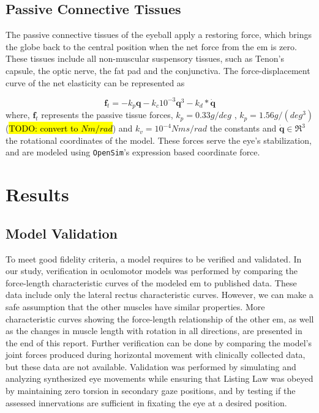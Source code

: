\documentclass[11pt,a4paper,draft=false]{report}
\renewcommand*{\vec}[1]{\bm{#1}}
\newcommand{\R}[1]{\mathfrak{R}^{#1}}
\newcommand{\inr}[1]{\in\R{#1}}
\begin{document}
\subsection*{Passive Connective Tissues}\label{sec:passive-connective-tissues}

The passive connective tissues of the eyeball apply a restoring force, which
brings the globe back to the central position when the net force from the
\gls{em} is zero. These tissues include all non-muscular suspensory tissues,
such as Tenon’s capsule, the optic nerve, the fat pad and the conjunctiva. The
force-displacement curve of the net elasticity can be represented as

\begin{equation}\label{equ:passive-tissue}
  \vec{f}_t = -k_p \vec{q} - k_c 10^{-3} \vec{q}^3 - k_d * \vec{\dot{q}}
\end{equation}
%
where, $\vec{f}_t$ represents the passive tissue forces,
$k_p= 0.33 g / deg$ , $k_p= 1.56 g / (deg^3)$  (\hl{TODO: convert to
	$Nm / rad$}) and
$k_v= 10^{-4} Nm s / rad$ the constants and $\vec{\dot{q}} \inr{3}$ the
rotational coordinates of the model. These forces serve the eye’s stabilization,
and are modeled using \texttt{OpenSim}'s expression based coordinate force.

\section*{Results}\label{sec:results}

\subsection*{Model Validation}\label{sec:model-validation}

To meet good fidelity criteria, a model requires to be verified and
validated. In our study, verification in oculomotor models was performed by
comparing the force-length characteristic curves of the modeled \gls{em} to
published data. These data include only the lateral rectus characteristic
curves. However, we can make a safe assumption that the other muscles have
similar properties. More characteristic curves showing the force-length
relationship of the other \gls{em}, as well as the changes in muscle length with
rotation in all directions, are presented in the end of this report. Further
verification can be done by comparing the model’s joint forces produced during
horizontal movement with clinically collected data, but these data are not
available.  Validation was performed by simulating and analyzing synthesized eye
movements while ensuring that Listing Law was obeyed by maintaining zero torsion
in secondary gaze positions, and by testing if the assessed innervations are
sufficient in fixating the eye at a desired position.
\end{document}
